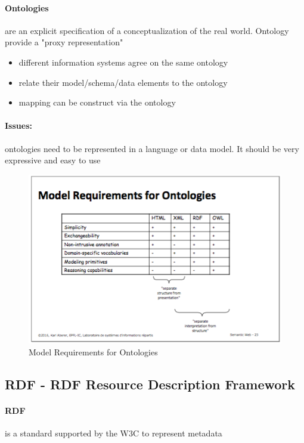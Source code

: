 \paragraph{Ontologies} are an explicit specification of a conceptualization of the real world. Ontology provide a "proxy representation"

\begin{itemize}
	\item different information systems agree on the same ontology
	\item relate their model/schema/data elements to the ontology
	\item mapping can be construct via the ontology
\end{itemize} 

\paragraph{Issues:} ontologies need to be represented in a language or data model. It should be very expressive and easy to use

\begin{figure}[H]
\begin{center}
\includegraphics[width=\textwidth]{figures/ontology.png}
\end{center}
\caption{Model Requirements for Ontologies}
\end{figure}


\subsection{RDF - RDF Resource Description Framework}

\paragraph{RDF} is a standard supported by the W3C to represent metadata

